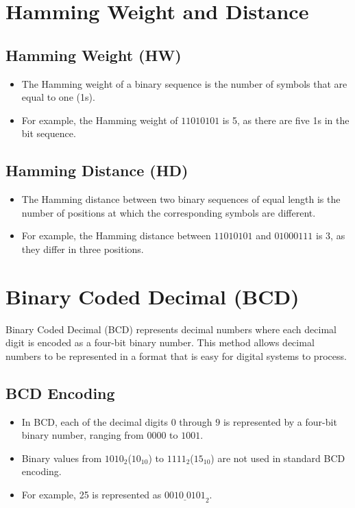 \documentclass[12pt,openany, tikz,border=10pt]{book}
\begin{document}
	
	\section{Hamming Weight and Distance}
	
	
	\subsection{Hamming Weight (HW)}
	\begin{itemize}
		\item[] The Hamming weight of a binary sequence is the number of symbols that are equal to one (1s).
		\item[] For example, the Hamming weight of \( 11010101 \) is 5, as there are five 1s in the bit sequence.
	\end{itemize}
	
	\subsection{Hamming Distance (HD)}
	\begin{itemize}
		\item[] The Hamming distance between two binary sequences of equal length is the number of positions at which the corresponding symbols are different.
		\item[] For example, the Hamming distance between \( 11010101 \) and \( 01000111 \) is 3, as they differ in three positions.
	\end{itemize}
	
	
	\section{Binary Coded Decimal (BCD)}
	
	Binary Coded Decimal (BCD) represents decimal numbers where each decimal digit is encoded as a four-bit binary number. This method allows decimal numbers to be represented in a format that is easy for digital systems to process.
	
	\subsection{BCD Encoding}
	
	\begin{itemize}
		\item In BCD, each of the decimal digits \(0\) through \(9\) is represented by a four-bit binary number, ranging from \(0000\) to \(1001\).
		\item Binary values from \(1010_2\)($10_{10}$) to \(1111_{2}\)($15_{10}$) are not used in standard BCD encoding.
		\item For example, 25 is represented as \(\underline{{0010 \; 0101}}_{2}\).
	\end{itemize}
	
\end{document}
